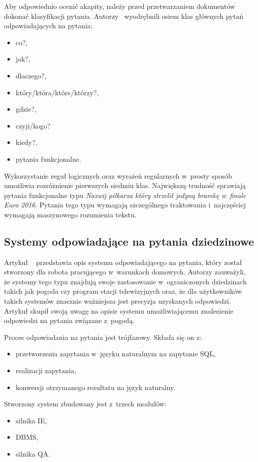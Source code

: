 Aby odpowiednio ocenić akapity, należy przed przetwarzaniem dokumentów dokonać klasyfikacji pytania. Autorzy~\cite{gupta2012survey} wyodrębnili osiem klas głównych pytań odpowiadających na pytania:
\begin{itemize}
	\item co?,
	\item jak?,
	\item dlaczego?,
	\item który/która/które/którzy?,
	\item gdzie?,
	\item czyji/kogo?
	\item kiedy?,
	\item pytania funkcjonalne.
\end{itemize}

Wykorzystanie reguł logicznych oraz wyrażeń regularnych w~prosty sposób umożliwia rozróżnienie pierwszych siedmiu klas. Największą trudność sprawiają pytania funkcjonalne typu \emph{Nazwij piłkarza który strzelił jedyną bramkę w~finale Euro 2016}. Pytania tego typu wymagają szczególnego traktowania i~najczęściej wymagają maszynowego rozumienia tekstu\cite{gupta2012survey}.

\subsection{Systemy odpowiadające na pytania dziedzinowe}\label{subsec:lit:res}

Artykuł ~\cite{restrictedWeather} przedstawia opis systemu odpowiadającego na pytania, który został stworzony dla robota pracującego w~warunkach domowych. Autorzy zauważyli, że systemy tego typu znajdują swoje zastosowanie w~ograniczonych dziedzinach takich jak pogoda czy program stacji telewizyjnych oraz, że dla użytkowników takich systemów znacznie ważniejsza jest precyzja uzyskanych odpowiedzi. Artykuł skupił swoją uwagę na opisie systemu umożliwiającemu znalezienie odpowiedzi na pytania związane z~pogodą. 

Proces odpowiadania na pytania jest trójfazowy. Składa się on z: 
\begin{itemize}
	\item przetworzenia zapytania w~języku naturalnym na zapytanie SQL,
	\item realizacji zapytania,
	\item konwersji otrzymanego rezultatu na język naturalny.
\end{itemize}
Stworzony system zbudowany jest z~trzech modułów: 
\begin{itemize}
	\item silnika IE, 
	\item DBMS, 
	\item silnika QA.
\end{itemize}

